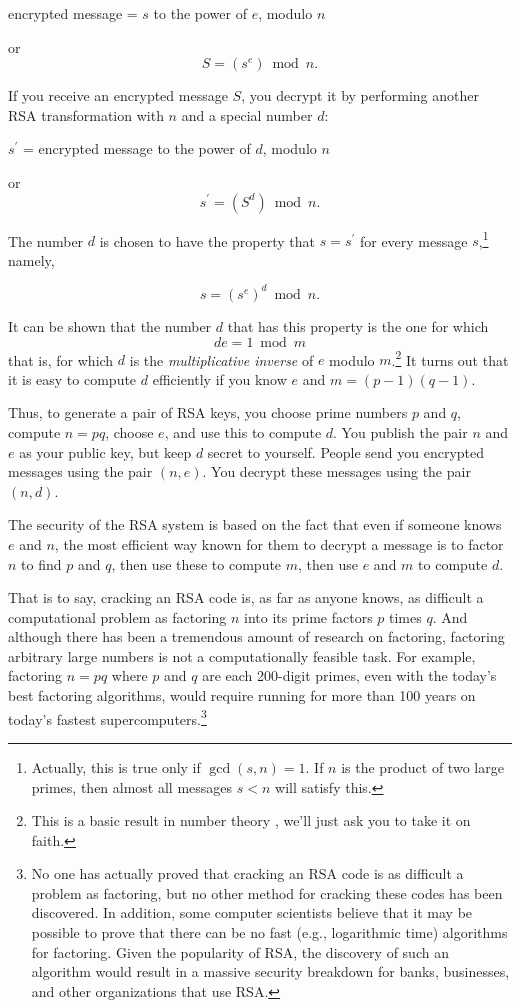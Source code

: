\smallskip
\centerline{encrypted message = $s$ to the power of $e$, modulo $n$}
or
\[S = (s^e) \bmod n.\]

If you receive an encrypted message $S$, you decrypt it by performing
another RSA transformation with $n$ and a special number $d$:

\smallskip \centerline{$s^\prime$ = encrypted message to the power of
$d$, modulo $n$} or \[s^\prime = (S^d) \bmod n.\]

The number $d$ is chosen to have the property that $s = s^\prime$ for
every message $s$,\footnote{Actually, this is true only if
$\gcd(s,n)=1$.  If $n$ is the product of two large primes, then almost
all messages $s<n$ will satisfy this.} namely,

\[s = (s^e)^d \bmod n.\]

It can be shown that the number $d$ that has this property is the one
for which
\begin{equation}
de=1 \bmod m
\end{equation}
that is, for which $d$ is the {\it multiplicative inverse} of $e$
modulo $m$.\footnote{This is a basic result in number theory , we'll
just ask you to take it on faith.} It turns out that it is easy to compute $d$
efficiently if you know $e$ and $m=(p-1)(q-1)$.

Thus, to generate a pair of RSA keys, you choose prime numbers $p$
and $q$, compute $n=pq$, choose $e$, and use this to compute $d$.
You publish the pair $n$ and $e$ as your public key, but keep $d$
secret to yourself.  People send you encrypted messages using the
pair $(n,e)$.  You decrypt these messages using the pair $(n,d)$.

The security of the RSA system is based on the fact that even if
someone knows $e$ and $n$, the most efficient way known for them to
decrypt a message is to factor $n$ to find $p$ and $q$, then use
these to compute $m$, then use $e$ and $m$ to compute $d$.

That is to say, cracking an RSA code is, as far as anyone knows, as
difficult a computational problem as factoring $n$ into its prime
factors $p$ times $q$.  And although there has been a tremendous
amount of research on factoring, factoring arbitrary large numbers is
not a computationally feasible task.  For example, factoring $n=pq$
where $p$ and $q$ are each 200-digit primes, even with the today's
best factoring algorithms, would require running for more than 100
years on today's fastest supercomputers.\footnote{No one has actually
proved that cracking an RSA code is as difficult a problem as
factoring, but no other method for cracking these codes has been
discovered.  In addition, some computer scientists believe that it
may be possible to prove that there can be no fast (e.g., logarithmic
time) algorithms for factoring.  Given the popularity of RSA, the
discovery of such an algorithm would result in a massive security
breakdown for banks, businesses, and other organizations that use
RSA.}


